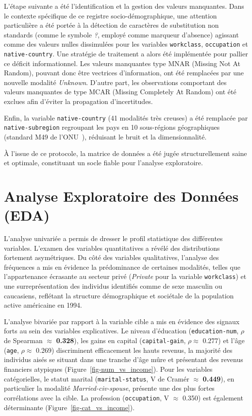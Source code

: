 \documentclass[10pt, a4paper]{article}
\begin{document}
L'étape suivante a été l'identification et la gestion des valeurs manquantes. Dans le contexte spécifique de ce registre socio-démographique, une attention particulière a été portée à la détection de caractères de substitution non standards (comme le symbole \textit{?}, employé comme marqueur d'absence) agissant comme des valeurs nulles dissimulées pour les variables \texttt{workclass}, \texttt{occupation} et \texttt{native-country}. Une stratégie de traitement a alors été implémentée pour pallier ce déficit informationnel. Les valeurs manquantes type MNAR (Missing Not At Random), pouvant donc être vectrices d'information, ont été remplacées par une nouvelle modalité \textit{Unknown}. D'autre part, les observations comportant des valeurs manquantes de type MCAR (Missing Completely At Random) ont été exclues afin d'éviter la propagation d'incertitudes.

Enfin, la variable \texttt{native-country} (41 modalités très creuses) a été remplacée par \texttt{native-subregion} regroupant les pays en 10 sous-régions géographiques (standard M49 de l'ONU~\cite{unm49}), réduisant le bruit et la dimensionnalité.

À l'issue de ce protocole, la matrice de données a été jugée structurellement saine et optimale, constituant un socle fiable pour l'analyse exploratoire.


\section{Analyse Exploratoire des Données (EDA)}

L'analyse univariée a permis de dresser le profil statistique des différentes variables. L'examen des variables quantitatives a révélé des distributions fortement asymétriques. Du côté des variables qualitatives, l'analyse des fréquences a mis en évidence la prédominance de certaines modalités, telles que l'appartenance écrasante au secteur privé (\textit{Private} pour la variable \texttt{workclass}) et une surreprésentation des individus identifiés comme de sexe masculin ou caucasiens, reflétant la structure démographique et sociétale de la population active américaine en 1994.


L'analyse bivariée par rapport à la variable cible a mis en évidence des signaux forts au sein des variables explicatives. Le niveau d'éducation (\texttt{education-num}, $\rho$ de Spearman $\approx$ \textbf{0.328}), les gains en capital (\texttt{capital-gain}, $\rho \approx$ 0.277) et l'âge (\texttt{age}, $\rho \approx$ 0.269) discriminent efficacement les hauts revenus, la majorité des individus aisés se situant dans une tranche d'âge mûre et présentant des revenus financiers atypiques (Figure~\ref{fig-num_vs_income}). 
Pour les variables catégorielles, le statut marital (\texttt{marital-status}, V de Cramér $\approx$ \textbf{0.449}), en particulier la modalité \textit{Married-civ-spouse}, présente une des plus fortes corrélations avec la cible. La profession (\texttt{occupation}, V $\approx$ 0.350) est également déterminante (Figure~\ref{fig-cat_vs_income}).
\end{document}
